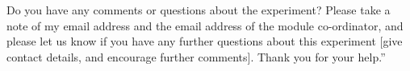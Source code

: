 \documentclass{l4proj}
\begin{document}
\begin{appendices}
Do you have any comments or questions about the experiment? Please take a note of my email address and the email address of  the module co-ordinator, and please let us know if you have any further questions about this experiment [give contact details, and encourage further comments]. Thank you for your help.”

\clearpage





\end{appendices}






\end{document}
